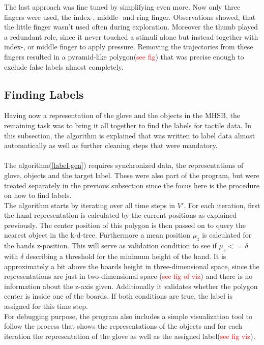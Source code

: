The last approach was fine tuned by simplifying even more. Now only three fingers were used, the index-, middle- and ring finger. Observations showed, that the little finger wasn't used often during exploration. Moreover the thumb played a redundant role, since it never touched a stimuli alone but instead together with index-, or middle finger to apply pressure. Removing the trajectories from these fingers resulted in a pyramid-like polygon(\textcolor{red}{see fig}) that was precise enough to exclude false labels almost completely.       
 
  

\subsection{Finding Labels}
Having now a representation of the glove and the objects in the MHSB, the remaining task was to bring it all together to find the labels for tactile data. In this subsection, the algorithm is explained that was written to label data almost automatically as well as further cleaning steps that were mandatory.\\
\\
The algorithm(\ref{label-gen}) requires synchronized data, the representations of glove, objects and the target label. These were also part of the program, but were treated separately in the previous subsection since the focus here is the procedure on how to find labels. \\
The algorithm starts by iterating over all time steps in $ V' $. For each iteration, first the hand representation is calculated by the current positions as explained previously. The center position of this polygon is then passed on to query the nearest object in the k-d-tree. Furthermore a mean position $ \mu_{z} $ is calculated for the hands z-position. This will serve as validation condition to see if $ \mu_{z} <= \delta $ with $ \delta $ describing a threshold for the minimum height of the hand. It is approximately a bit above the boards height in three-dimensional space, since the representations are just in two-dimensional space (\textcolor{red}{see fig of viz}) and there is no information about the z-axis given. Additionally it validates whether the polygon center is inside one of the boards. If both conditions are true, the label is assigned for this time step.\\
For debugging purpose, the program also includes a simple visualization tool to follow the process that shows the representations of the objects and for each iteration the representation of the glove as well as the assigned label(\textcolor{red}{see fig viz}). \\


